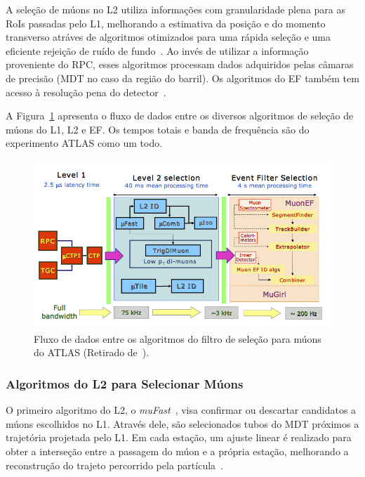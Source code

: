 A seleção de múons no L2 utiliza informações com granularidade plena para as
RoIs passadas pelo L1, melhorando a estimativa da posição e do momento
transverso atráves de algoritmos otimizados para uma rápida seleção e uma
eficiente rejeição de ruído de fundo~\cite{VENTURA2010}. Ao invés de utilizar a
informação proveniente do RPC, esses algoritmos processam dados adquiridos
pelas câmaras de precisão (MDT no caso da região do barril). Os algoritmos do EF
também tem acesso à resolução pena do detector~\cite{KORDAS2007}.


A Figura~\ref{fig:MUONHLTFLOW} apresenta o fluxo de dados entre os diversos algoritmos de
seleção de múons do L1, L2 e EF. Os tempos totais e banda de frequência são do
experimento ATLAS como um todo.

\begin{figure}[htpb!]
    \centering
    \includegraphics[width=\textwidth]{images/hlt_flow_muon.png}
    \caption[ Fluxo de dados entre os algoritmos do filtro de seleção para múons
    do ATLAS] {Fluxo de dados entre os algoritmos do filtro de seleção para
        múons do ATLAS (Retirado de~\cite{VENTURA2010}).}
    \label{fig:MUONHLTFLOW}
\end{figure}

\subsubsection{Algoritmos do L2 para Selecionar Múons}

O primeiro algoritmo do L2, o \emph{muFast}~\cite{DIMATTIA2003}, visa confirmar
ou descartar candidatos a múons escolhidos no L1. Através dele, são selecionados
tubos do MDT próximos a trajetória projetada pelo L1. Em cada estação, um ajuste
linear é realizado para obter a interseção entre a passagem do múon e a própria
estação, melhorando a reconstrução do trajeto percorrido pela
partícula~\cite{DIMATTIA2011}.

